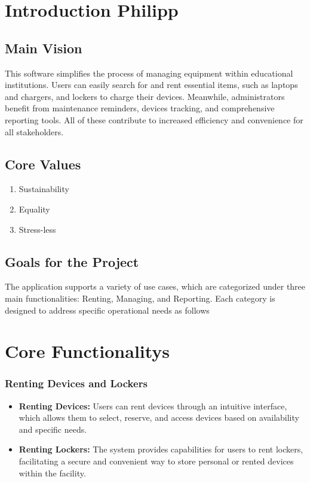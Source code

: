 \section{Introduction Philipp}
\subsection{Main Vision}
This software simplifies the process of managing equipment within educational institutions. Users can easily search for and rent essential items, such as laptops and chargers, and lockers to charge their devices.
Meanwhile, administrators benefit from maintenance reminders, devices tracking, and comprehensive reporting tools. All of these contribute to increased efficiency and convenience for all stakeholders.
\subsection{Core Values}
\begin{enumerate}
    \item Sustainability
    \item Equality
    \item Stress-less
\end{enumerate}

\subsection{Goals for the Project}
The application supports a variety of use cases, which are categorized under three main functionalities: Renting, Managing, and Reporting. Each category is designed to address specific operational needs as follows

\section{Core Functionalitys}
\subsubsection{Renting Devices and Lockers}
\begin{itemize}
\item \textbf{Renting Devices:} Users can rent devices through an intuitive interface, which allows them to select, reserve, and access devices based on availability and specific needs.
\item \textbf{Renting Lockers:} The system provides capabilities for users to rent lockers, facilitating a secure and convenient way to store personal or rented devices within the facility.
\end{itemize}

